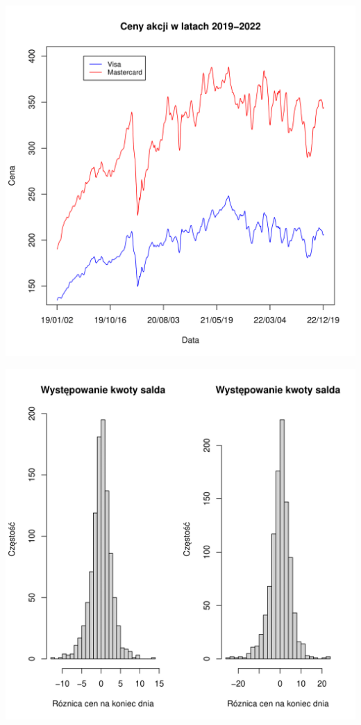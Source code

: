 \documentclass{beamer}
\begin{document}
\begin{frame}
  \centering \includegraphics[scale=0.55]{images/wykres.png} 
\end{frame}

\begin{frame}
  \centering \includegraphics[scale=0.55]{images/histogram.png} 
\end{frame}
\end{document}
